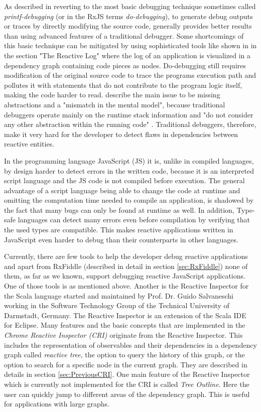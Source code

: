 As described in \cite{MSDN_DebugginObservables} reverting to the most basic debugging technique sometimes called \emph{printf-debugging} (or in the RxJS terms \emph{do-debugging}), to generate debug outputs or traces by directly modifying the source code, generally provides better results than using advanced features of a traditional debugger. Some shortcomings of this basic technique can be mitigated by using sophisticated tools like shown in \cite{ShinyGraphFromLog} in the section "The Reactive Log" where the log of an application is visualized in a dependency graph containing code pieces as nodes. Do-debugging still requires modification of the original source code to trace the programs execution path and pollutes it with statements that do not contribute to the program logic itself, making the code harder to read. \cite{PaperReactiveProgramming} describe the main issue to be missing abstractions and a "mismatch in the mental model", because traditional debuggers operate mainly on the runtime stack information and "do not consider any other abstraction within the running code" \cite{ThesisAbbas}. Traditional debuggers, therefore, make it very hard for the developer to detect flaws in dependencies between reactive entities.

In the programming language JavaScript (JS) it is, unlike in compiled languages, by design harder to detect errors in the written code, because it is an interpreted script language and the JS code is not compiled before execution. The general advantage of a script language being able to change the code at runtime and omitting the computation time needed to compile an application, is shadowed by the fact that many bugs can only be found at runtime as well. In addition, Type-safe languages can detect many errors even before compilation by verifying that the used types are compatible. This makes reactive applications written in JavaScript even harder to debug than their counterparts in other languages.

Currently, there are few tools to help the developer debug reactive applications and apart from RxFiddle (described in detail in section \ref{sec:RxFiddle}) none of them, as far as we known, support debugging reactive JavaScript applications. One of those tools is \cite{ShinyGraphFromLog} as mentioned above. Another is the Reactive Inspector for the Scala language \cite{ReactiveInspector} started and maintained by Prof. Dr. Guido Salvaneschi working in the Software Technology Group of the Technical University of Darmstadt, Germany.
The Reactive Inspector is an extension of the Scala IDE for Eclipse. Many features and the basic concepts that are implemented in the \emph{Chrome Reactive Inspector (CRI)} originate from the Reactive Inspector. This includes the representation of observables and their dependencies in a dependency graph called \emph{reactive tree}, the option to query the history of this graph, or the option to search for a specific node in the current graph. They are described in details in section \ref{sec:PreviousCRI}. One main feature of the Reactive Inspector which is currently not implemented for the CRI is called \emph{Tree Outline}. Here the user can quickly jump to different areas of the dependency graph. This is useful for applications with large graphs.

